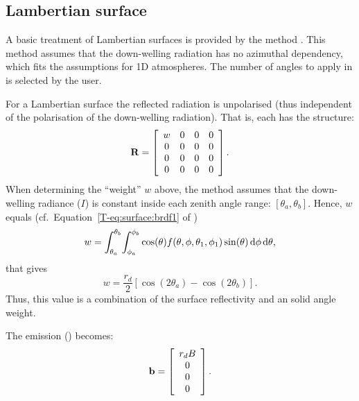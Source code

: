 \subsection{Lambertian surface}
A basic treatment of Lambertian surfaces is provided by the method
. This method assumes that the down-welling
radiation has no azimuthal dependency, which fits the assumptions for 1D
atmospheres. The number of angles to apply in  is
selected by the user. 

For a Lambertian surface the reflected radiation is unpolarised (thus
independent of the polarisation of the down-welling radiation). That is,
each  has the structure:
\begin{equation}
  \mathbf{R} =
     \left[\begin{array}{cccc}
       w&0&0&0\\
       0&0&0&0\\
       0&0&0&0\\
       0&0&0&0\\
     \end{array}
     \right].
\end{equation}
When determining the ``weight'' $w$ above, the method assumes that the
down-welling radiance ($I$) is constant inside each zenith angle range:
$[\theta_a,\theta_b]$. Hence, $w$ equals (cf.\
Equation~\ref{T-eq:surface:brdf1} of \theory)
\begin{equation}
  \label{eq:surface:brdf2}
  w = \int_{\theta_a}^{\theta_b} \! \int_{\phi_a}^{\phi_b} 
  \cos(\theta) f(\theta,\phi,\theta_1,\phi_1)
  \sin(\theta) \, \mathrm{d}\phi \, \mathrm{d}\theta,
\end{equation}
that gives
\begin{equation}
  w = \frac{r_d}{2}\left[\cos(2\theta_a)-\cos(2\theta_b)\right].
\end{equation}
Thus, this value is a combination of the surface reflectivity and an solid
angle weight.


The emission () becomes:
\begin{equation}
  \label{eq:surface:blambertian} 
  \mathbf{b} =  \left[\begin{array}{c} r_dB \\ 0 \\0\\0 \end{array}\right].
\end{equation}



